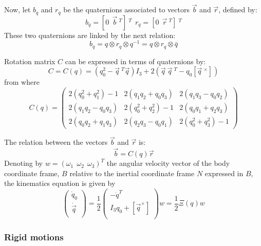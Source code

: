  Now, let $b_q$ and $r_q$ be the quaternions associated to vectors $\vec{b}$ and $\vec{r}$, defined by:
 \begin{equation}
   b_q=[0 \ \ \vec{b}\ ^T]\ ^T \ \ r_q=[0 \ \ \vec{r}\ ^T]\ ^T
 \end{equation}
 These two quaternions are linked by the next relation:
 \begin{equation}
   b_q=q\otimes r_q \otimes q^{-1}=q \otimes r_q \otimes \bar{q}
 \end{equation}

 Rotation matrix $C$ can be expressed in terms of quaternions by:
 \begin{equation}\label{rotq}
   C=C(q)=(q_0^2-\vec{q}\ ^T\vec{q})I_3+2(\vec{q}\ \vec{q}\ ^T-q_0[\vec{q}\ ^\times])
 \end{equation} from where
 \begin{equation}\label{Cq}
   C(q)=\left(\begin{array}{ccc}
                2(q_0^2+q_1^2)-1 & 2(q_1q_2+q_0q_3) & 2(q_1q_3-q_0q_2) \\
                2(q_1q_2-q_0q_3) & 2(q_0^2+q_2^2)-1 & 2(q_0q_1+q_2q_3) \\
                2(q_0q_2+q_1q_3) & 2(q_2q_3-q_0q_1) & 2(q_0^2+q_3^2)-1 \end{array}\right)
 \end{equation}

 The relation between the vectors $\vec{b}$ and $\vec{r}$ is:
 \begin{equation}
   \vec{b}=C(q)\vec{r}
 \end{equation}
 Denoting by $w=(\omega_1\ \ \omega_2\ \ \omega_3)^T$ the angular velocity vector of the body coordinate frame, $B$ relative to the inertial  coordinate frame $N$ expressed in $B$, the kinematics equation is given by
 \begin{equation}\label{eqkinematic}
 \left(%
 \begin{array}{c}
   \dot{q}_0 \\
   \dot{\vec{q}} \\
 \end{array}%
 \right) =  \frac{1}{2}\left(%
 \begin{array}{c}
   -\dot{q}^T \\
   I_3q_0 + [\vec{q}^\times] \\
 \end{array}%
 \right) w=\frac{1}{2}\Xi(q)w
 \end{equation}

 \subsubsection{Rigid motions}

